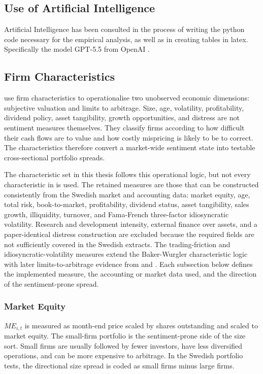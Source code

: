 \documentclass[11pt]{article}
\newcommand{\var}[1]{\ensuremath{#1}}
\begin{document}
\subsection{Use of Artificial Intelligence}
Artificial Intelligence has been consulted in the process of writing the python code necessary for the empirical analysis, as well as in creating tables in latex. Specifically the model GPT-5.5 from OpenAI \citep{openai2026gpt55}.

\subsection{Firm Characteristics}
\citet{baker2006sentiment} use firm characteristics to operationalise two unobserved economic dimensions: subjective valuation and limits to arbitrage. Size, age, volatility, profitability, dividend policy, asset tangibility, growth opportunities, and distress are not sentiment measures themselves. They classify firms according to how difficult their cash flows are to value and how costly mispricing is likely to be to correct. The characteristics therefore convert a market-wide sentiment state into testable cross-sectional portfolio spreads.

The characteristic set in this thesis follows this operational logic, but not every characteristic in \citet{baker2006sentiment} is used. The retained measures are those that can be constructed consistently from the Swedish market and accounting data: market equity, age, total risk, book-to-market, profitability, dividend status, asset tangibility, sales growth, illiquidity, turnover, and Fama-French three-factor idiosyncratic volatility. Research and development intensity, external finance over assets, and a paper-identical distress construction are excluded because the required fields are not sufficiently covered in the Swedish extracts. The trading-friction and idiosyncratic-volatility measures extend the Baker-Wurgler characteristic logic with later limits-to-arbitrage evidence from \citet{stambaugh2012short} and \citet{stambaugh2015ivol}. Each subsection below defines the implemented measure, the accounting or market data used, and the direction of the sentiment-prone spread.

\subsubsection{Market Equity}
\var{ME_{i,t}} is measured as month-end price scaled by shares outstanding and scaled to market equity. The small-firm portfolio is the sentiment-prone side of the size sort. Small firms are usually followed by fewer investors, have less diversified operations, and can be more expensive to arbitrage. In the Swedish portfolio tests, the directional size spread is coded as small firms minus large firms.
\end{document}
